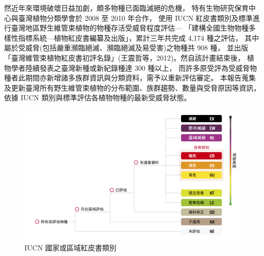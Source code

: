 \begin{multicols}{2}
然近年來環境破壞日益加劇，頗多物種已面臨滅絕的危機，
特有生物研究保育中心與臺灣植物分類學會於 2008 至 2010 年合作，
使用 IUCN 紅皮書類別及標準進行臺灣地區野生維管束植物的物種存活受威脅程度評估---
「建構全國生物物種多樣性指標系統---植物紅皮書編纂及出版」，累計三年共完成 4,174 種之評估，
其中屬於受威脅(包括嚴重瀕臨絕滅、瀕臨絕滅及易受害)之物種共 908 種，
並出版「臺灣維管束植物紅皮書初評名錄」(王震哲等，2012)。然自該計畫結束後，
植物學者陸續發表之臺灣新種或新紀錄種達 300 種以上，
而許多原受評為受威脅物種者此期間亦新增諸多族群資訊與分類資料，需予以重新評估審定。
本報告蒐集及更新臺灣所有野生維管束植物的分布範圍、族群趨勢、數量與受脅原因等資訊，
依據 IUCN 類別與標準評估各植物物種的最新受威脅狀態。\\
\end{multicols}
\begin{figure}[!ht]
    \includegraphics[width=\textwidth]{images/fig1.png}
    \caption{IUCN 國家或區域紅皮書類別} \label{fig1}
\end{figure}

%
